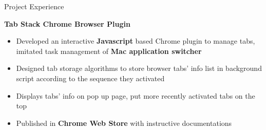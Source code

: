 \documentclass[]{mcdowellcv}
\begin{document}
    
    
	\begin{cvsection}{Project Experience}
	
        
    
        \begin{cvsubsection}{}{}{}
        \textbf{Tab Stack Chrome Browser Plugin}
        \begin{itemize}
\item Developed an interactive \textbf{Javascript} based Chrome plugin to manage tabs, imitated task management of \textbf{Mac application switcher}
\item Designed tab storage algorithms to store browser tabs' info list in background script according to the sequence they activated
\item Displays tabs' info on pop up page, put more recently activated tabs on the top
\item Published in \textbf{Chrome Web Store} with instructive documentations
            \end{itemize}
           \end{cvsubsection} 


\end{cvsection}
\end{document}

